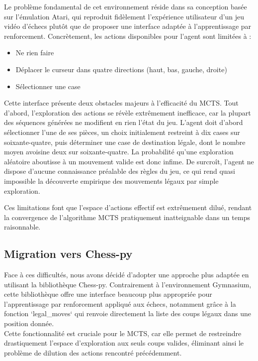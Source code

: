 \documentclass{article}
\begin{document}
Le problème fondamental de cet environnement réside dans sa conception basée sur l'émulation Atari, qui reproduit fidèlement l'expérience utilisateur d'un jeu vidéo d'échecs plutôt que de proposer une interface adaptée à l'apprentissage par renforcement. Concrètement, les actions disponibles pour l'agent sont limitées à :
\begin{itemize} 
    \item Ne rien faire
    \item Déplacer le curseur dans quatre directions (haut, bas, gauche, droite)
    \item Sélectionner une case
\end{itemize}

Cette interface présente deux obstacles majeurs à l'efficacité du MCTS. Tout d'abord, l'exploration des actions se révèle extrêmement inefficace, car la plupart des séquences générées ne modifient en rien l'état du jeu. L'agent doit d'abord sélectionner l'une de ses pièces, un choix initialement restreint à dix cases sur soixante-quatre, puis déterminer une case de destination légale, dont le nombre moyen avoisine deux sur soixante-quatre. La probabilité qu'une exploration aléatoire aboutisse à un mouvement valide est donc infime. De surcroît, l'agent ne dispose d'aucune connaissance préalable des règles du jeu, ce qui rend quasi impossible la découverte empirique des mouvements légaux par simple exploration.

Ces limitations font que l'espace d'actions effectif est extrêmement dilué, rendant la convergence de l'algorithme MCTS pratiquement inatteignable dans un temps raisonnable.

\subsection{Migration vers Chess-py}

\quad Face à ces difficultés, nous avons décidé d'adopter une approche plus adaptée en utilisant la bibliothèque Chess-py. Contrairement à l'environnement Gymnasium, cette bibliothèque offre une interface beaucoup plus appropriée pour l'apprentissage par renforcement appliqué aux échecs, notamment grâce à la fonction `legal\_moves` qui renvoie directement la liste des coups légaux dans une position donnée.\\

Cette fonctionnalité est cruciale pour le MCTS, car elle permet de restreindre drastiquement l'espace d'exploration aux seuls coups valides, éliminant ainsi le problème de dilution des actions rencontré précédemment.\\
\end{document}
